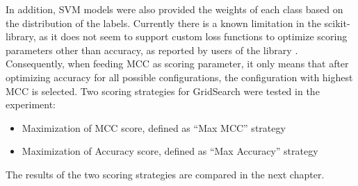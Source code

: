 In addition, \ac{SVM} models were also provided the weights of each class based on the distribution of the labels. Currently there is a known limitation in the scikit-library, as it does not seem to support custom loss functions to optimize scoring parameters other than accuracy, as reported by users of the library \cite{martin_stacked_nodate, noauthor_please_nodate}. Consequently, when feeding \ac{MCC} as scoring parameter, it only means that after optimizing accuracy for all possible configurations, the configuration with highest \ac{MCC} is selected. Two scoring strategies for GridSearch were tested in the experiment:
\begin{itemize}
\item 	Maximization of \ac{MCC} score, defined as “Max MCC” strategy
\item 	Maximization of Accuracy score, defined as “Max Accuracy” strategy
\end{itemize}
The results of the two scoring strategies are compared in the next chapter.

